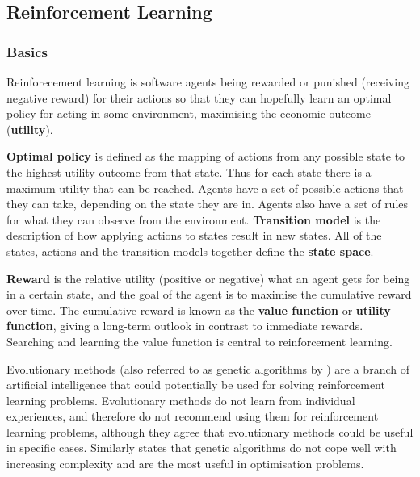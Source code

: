 \subsection{Reinforcement Learning}
\label{sec:ai}


\subsubsection{Basics}
\label{sec:ai:basics}

Reinforecement learning is software agents being rewarded or punished
(receiving negative reward) for their actions so that they can hopefully learn
an optimal policy for acting in some environment, maximising the economic
outcome (\textbf{utility}).

\textbf{Optimal policy} is defined as the mapping of actions from any possible
state to the highest utility outcome from that state. Thus for each state there
is a maximum utility that can be reached. Agents have a set of possible actions
that they can take, depending on the state they are in. Agents also have a set
of rules for what they can observe from the environment. \textbf{Transition
model} is the description of how applying actions to states result in new
states. All of the states, actions and the transition models together define
the \textbf{state space}. \parencite{Russell2010ai+modern,
Sutton1998ai+reinforcement}

\textbf{Reward} is the relative utility (positive or negative) what an agent
gets for being in a certain state, and the goal of the agent is to maximise the
cumulative reward over time. The cumulative reward is known as the
\textbf{value function} or \textbf{utility function}, giving a long-term
outlook in contrast to immediate rewards. Searching and learning the value
function is central to reinforcement learning. \parencite{Russell2010ai+modern,
Sutton1998ai+reinforcement}

Evolutionary methods \parencite{Sutton1998ai+reinforcement} (also referred to
as genetic algorithms by \textcite{Russell2010ai+modern}) are a branch of
artificial intelligence that could potentially be used for solving
reinforcement learning problems. Evolutionary methods do not learn from
individual experiences, and therefore \textcite{Sutton1998ai+reinforcement} do
not recommend using them for reinforcement learning problems, although they
agree that evolutionary methods could be useful in specific cases. Similarly
\textcite{Russell2010ai+modern} states that genetic algorithms do not cope well
with increasing complexity and are the most useful in optimisation problems.


